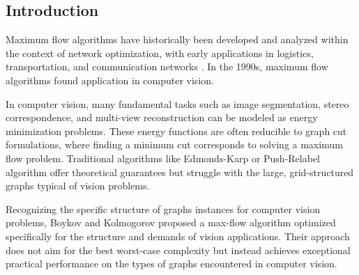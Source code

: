 \subsection{Introduction}
Maximum flow algorithms have historically been developed and analyzed within the context of network optimization, with early applications in logistics, transportation, and communication networks \cite{greig}. In the 1990s, maximum flow algorithms found application in computer vision.

In computer vision, many fundamental tasks such as image segmentation, stereo correspondence, and multi-view reconstruction can be modeled as energy minimization problems. These energy functions are often reducible to graph cut formulations, where finding a minimum cut corresponds to solving a maximum flow problem. Traditional algorithms like Edmonds-Karp or Push-Relabel algorithm offer theoretical guarantees but struggle with the large, grid-structured graphs typical of vision problems. 

Recognizing the specific structure of graphs instances for computer vision problems, Boykov and Kolmogorov proposed a max-flow algorithm optimized specifically for the structure and demands of vision applications. Their approach does not aim for the best worst-case complexity but instead achieves exceptional practical performance on the types of graphs encountered in computer vision.

